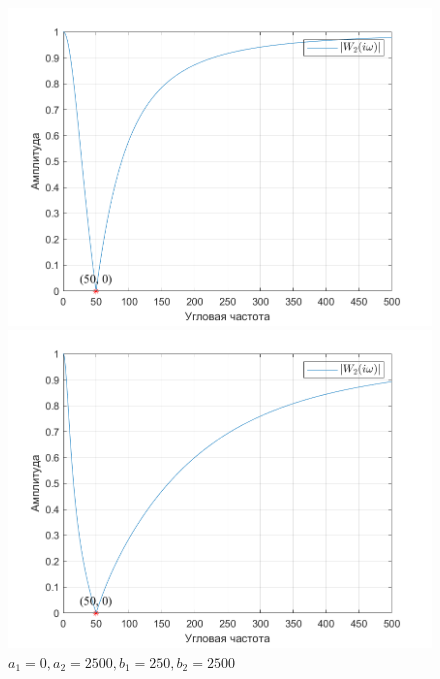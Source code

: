 \documentclass[a4paper]{article}
\begin{document}
\begin{figure}[H]
    \begin{minipage}{0.5\textwidth}
        \centering
        \includegraphics[width=\linewidth]{ex1_2/a1=0_a2=2500_b1=105_b2=2500_d=50/h1.png}
        \caption{$a_1=0, a_2=2500, b_1=105, b_2=2500$}
    \end{minipage}
    \begin{minipage}{0.5\textwidth}
        \centering
        \includegraphics[width=\linewidth]{ex1_2/a1=0_a2=2500_b1=250_b2=2500_d=50/h1.png}
        \caption{$a_1=0, a_2=2500, b_1=250, b_2=2500$}
    \end{minipage}
\end{figure}
\end{document}
